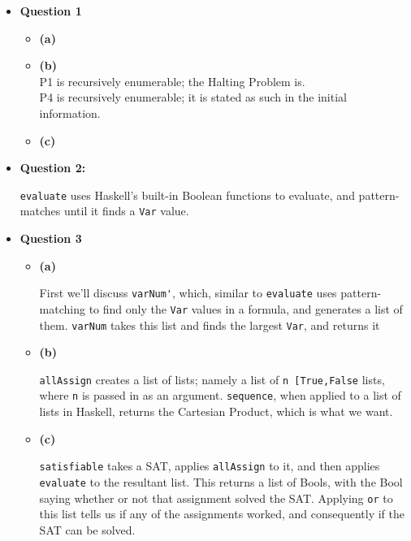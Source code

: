 \documentclass[12pt]{article}
\begin{document}
\maketitle
\begin{itemize}
  \item \textbf{Question 1}
    \begin{itemize}
      \item \textbf{(a)}\\
      \item \textbf{(b)}\\
        P1 is recursively enumerable; the Halting Problem is.\\
        P4 is recursively enumerable; it is stated as such in the initial information.\\
      \item \textbf{(c)}\\
    \end{itemize}

    \pagebreak
  \item \textbf{Question 2:}
    
    \verb|evaluate| uses Haskell's built-in Boolean functions to evaluate, and pattern-matches until it finds a \verb|Var|
    value.

    \pagebreak
  \item \textbf{Question 3}
    \begin{itemize}
      \item \textbf{(a)}
        
        First we'll discuss \verb|varNum'|, which, similar to \verb|evaluate| uses pattern-matching to find only the
        \verb|Var| values in a formula, and generates a list of them. \verb|varNum| takes this list and finds the largest
        \verb|Var|, and returns it

      \item \textbf{(b)}
        
        \verb|allAssign| creates a list of lists; namely a list of \verb|n [True,False| lists, where \verb|n| is passed in as
        an argument. \verb|sequence|, when applied to a list of lists in Haskell, returns the Cartesian Product, which is what
        we want.

      \item \textbf{(c)}
        
        \verb|satisfiable| takes a SAT, applies \verb|allAssign| to it, and then applies \verb|evaluate| to the resultant
        list. This returns a list of Bools, with the Bool saying whether or not that assignment solved the SAT. Applying
        \verb|or| to this list tells us if any of the assignments worked, and consequently if the SAT can be solved.


\end{itemize}
\end{itemize}
\end{document}
